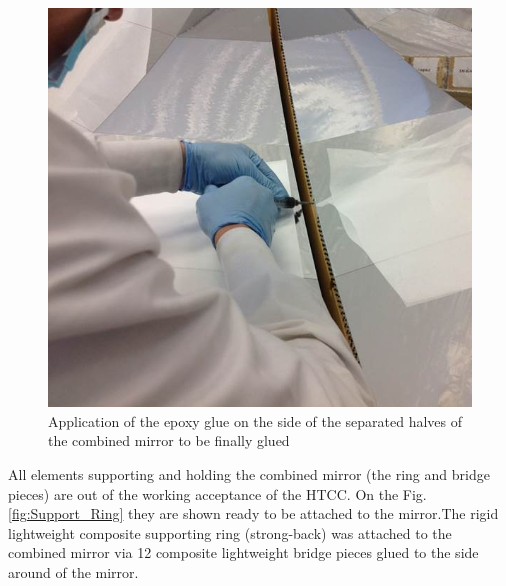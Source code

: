    \begin{figure}[h]
    \centering
    \includegraphics[width=1.0\linewidth]{images/Final_Gluing.jpg}
    \caption{Application of the epoxy glue on the side of the separated halves of the combined mirror to be finally glued}
    \label{fig:Final_Gluing}
\end{figure}
  
  All elements supporting and holding the combined mirror (the ring and bridge pieces) are out of the working acceptance of the HTCC. On the Fig.\ref{fig:Support_Ring} they are shown ready to be attached to the mirror.The rigid lightweight composite supporting ring (strong-back) was attached to the combined mirror via 12 composite lightweight bridge pieces glued to the side around of the mirror. 
  

